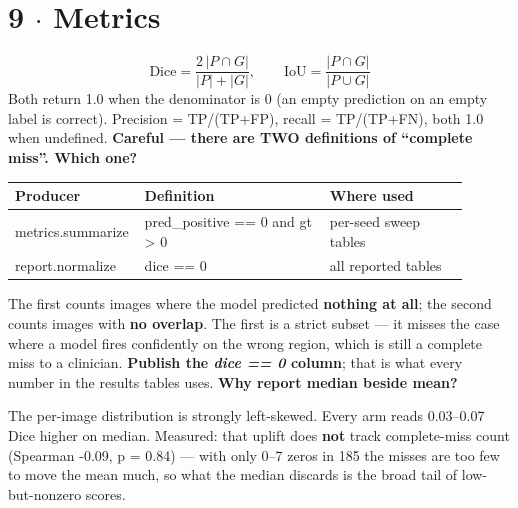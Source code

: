 \documentclass[10pt,a4paper]{article}
\newcommand{\qq}[1]{\medskip\noindent\textbf{\color{navy}#1}\par\nobreak}
\begin{document}
\section*{9 $\cdot$ Metrics}
\[\mathrm{Dice} = \frac{2\,|P \cap G|}{|P| + |G|}, \qquad \mathrm{IoU} = \frac{|P \cap G|}{|P \cup G|}\]
Both return 1.0 when the denominator is 0 (an empty prediction on an empty label is correct). Precision = TP/(TP+FP), recall = TP/(TP+FN), both 1.0 when undefined.
\qq{Careful — there are TWO definitions of ``complete miss''. Which one?}
\begin{center}\small\begin{tabular}{p{0.2\linewidth}p{0.4\linewidth}p{0.3\linewidth}}
\toprule
\textbf{Producer} & \textbf{Definition} & \textbf{Where used} \\
\midrule
metrics.summarize & pred_positive == 0 and gt > 0 & per-seed sweep tables \\
report.normalize & dice == 0 & all reported tables \\
\bottomrule\end{tabular}\end{center}
The first counts images where the model predicted \textbf{nothing at all}; the second counts images with \textbf{no overlap}. The first is a strict subset — it misses the case where a model fires confidently on the wrong region, which is still a complete miss to a clinician. \textbf{Publish the \textit{dice == 0} column}; that is what every number in the results tables uses.
\qq{Why report median beside mean?}
The per-image distribution is strongly left-skewed. Every arm reads 0.03–0.07 Dice higher on median. Measured: that uplift does \textbf{not} track complete-miss count (Spearman -0.09, p = 0.84) — with only 0–7 zeros in 185 the misses are too few to move the mean much, so what the median discards is the broad tail of low-but-nonzero scores.
\end{document}
